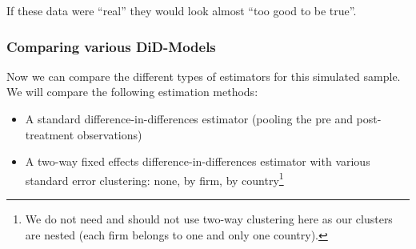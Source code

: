\documentclass[
  letterpaper,
  DIV=11,
  numbers=noendperiod]{scrartcl}
\providecommand{\tightlist}{%
  \setlength{\itemsep}{0pt}\setlength{\parskip}{0pt}}\usepackage{longtable,booktabs,array}
\begin{document}
If these data were ``real'' they would look almost ``too good to be
true''.

\subsubsection{Comparing various
DiD-Models}\label{comparing-various-did-models}

Now we can compare the different types of estimators for this simulated
sample. We will compare the following estimation methods:

\begin{itemize}
\tightlist
\item
  A standard difference-in-differences estimator (pooling the pre and
  post-treatment observations)
\item
  A two-way fixed effects difference-in-differences estimator with
  various standard error clustering: none, by firm, by
  country\footnote{We do not need and should not use two-way clustering
    here as our clusters are nested (each firm belongs to one and only
    one country).}
\end{itemize}
\end{document}
